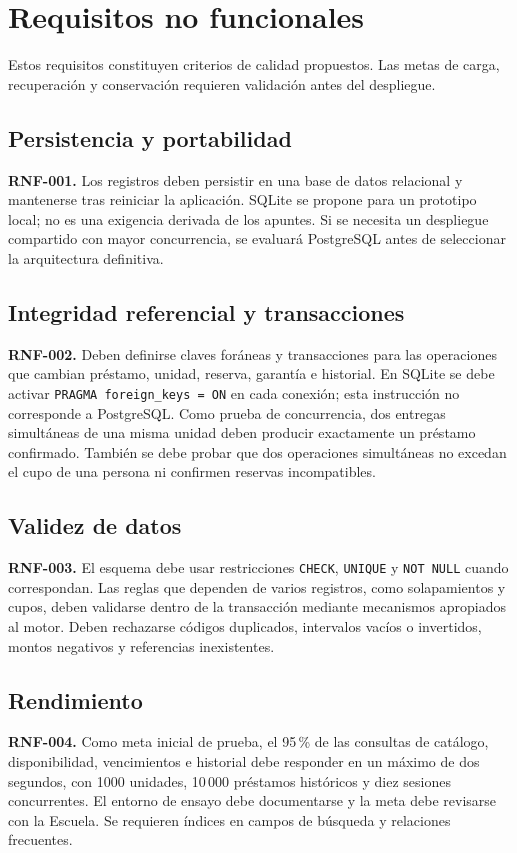 \chapter{Requisitos no funcionales}
\label{cap:rnf}

Estos requisitos constituyen criterios de calidad propuestos. Las metas de carga, recuperaci\'on y conservaci\'on requieren validaci\'on antes del despliegue.

\section{Persistencia y portabilidad}
\textbf{RNF-001.} Los registros deben persistir en una base de datos relacional y mantenerse tras reiniciar la aplicaci\'on. SQLite se propone para un prototipo local; no es una exigencia derivada de los apuntes. Si se necesita un despliegue compartido con mayor concurrencia, se evaluar\'a PostgreSQL antes de seleccionar la arquitectura definitiva.

\section{Integridad referencial y transacciones}
\textbf{RNF-002.} Deben definirse claves for\'aneas y transacciones para las operaciones que cambian pr\'estamo, unidad, reserva, garant\'ia e historial. En SQLite se debe activar \texttt{PRAGMA foreign\_keys = ON} en cada conexi\'on; esta instrucci\'on no corresponde a PostgreSQL. Como prueba de concurrencia, dos entregas simult\'aneas de una misma unidad deben producir exactamente un pr\'estamo confirmado. Tambi\'en se debe probar que dos operaciones simult\'aneas no excedan el cupo de una persona ni confirmen reservas incompatibles.

\section{Validez de datos}
\textbf{RNF-003.} El esquema debe usar restricciones \texttt{CHECK}, \texttt{UNIQUE} y \texttt{NOT NULL} cuando correspondan. Las reglas que dependen de varios registros, como solapamientos y cupos, deben validarse dentro de la transacci\'on mediante mecanismos apropiados al motor. Deben rechazarse c\'odigos duplicados, intervalos vac\'ios o invertidos, montos negativos y referencias inexistentes.

\section{Rendimiento}
\textbf{RNF-004.} Como meta inicial de prueba, el 95\,\% de las consultas de cat\'alogo, disponibilidad, vencimientos e historial debe responder en un m\'aximo de dos segundos, con 1000 unidades, 10\,000 pr\'estamos hist\'oricos y diez sesiones concurrentes. El entorno de ensayo debe documentarse y la meta debe revisarse con la Escuela. Se requieren \'indices en campos de b\'usqueda y relaciones frecuentes.

